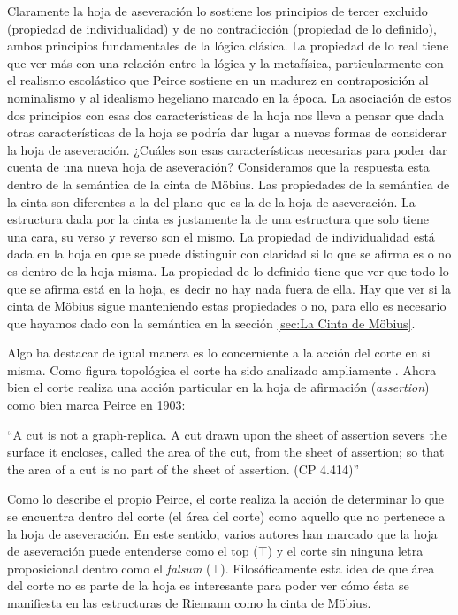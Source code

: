 \documentclass[
	fontsize=10pt, %
	twoside=false, %
	secnumdepth=1, %
	abstract=true, %
]{kaohandt}
\begin{document}
Claramente la hoja de aseveración lo sostiene los principios de tercer excluido (propiedad de individualidad) y de no contradicción (propiedad de lo definido), ambos principios fundamentales de la lógica clásica. La propiedad de lo real tiene que ver más con una relación entre la lógica y la metafísica, particularmente con el realismo escolástico que Peirce sostiene en un madurez en contraposición al nominalismo y al idealismo hegeliano marcado en la época. La asociación de estos dos principios con esas dos características de la hoja nos lleva a pensar que dada otras características de la hoja se podría dar lugar a nuevas formas de considerar la hoja de aseveración. ¿Cuáles son esas características necesarias para poder dar cuenta de una nueva hoja de aseveración? Consideramos que la respuesta esta dentro de la semántica de la cinta de Möbius. Las propiedades de la semántica de la cinta son diferentes a la del plano que es la de la hoja de aseveración. La estructura dada por la cinta es justamente la de una estructura que solo tiene una cara, su verso y reverso son el mismo. La propiedad de individualidad está dada en la hoja en que se puede distinguir con claridad si lo que se afirma es o no es dentro de la hoja misma. La propiedad de lo definido tiene que ver que todo lo que se afirma está en la hoja, es decir no hay nada fuera de ella. Hay que ver si la cinta de Möbius sigue manteniendo estas propiedades o no, para ello es necesario que hayamos dado con la semántica en la sección \ref{sec:La Cinta de Möbius}.

Algo ha destacar de igual manera es lo concerniente a la acción del corte en si misma. Como figura topológica el corte ha sido analizado ampliamente . Ahora bien el corte realiza una acción particular en la hoja de afirmación (\emph{assertion}) como bien marca Peirce en 1903:

\enquote{A cut is not a graph-replica. A cut drawn upon the sheet of assertion severs the surface it encloses, called the area of the cut, from the sheet of assertion; so that the area of a cut is no part of the sheet of assertion. (CP 4.414)}

Como lo describe el propio Peirce, el corte realiza la acción de determinar lo que se encuentra dentro del corte (el área del corte) como aquello que no pertenece a la hoja de aseveración. En este sentido, varios autores han marcado que la hoja de aseveración puede entenderse como el top ($\top$) y el corte sin ninguna letra proposicional dentro como el \textit{falsum} ($\bot$). Filosóficamente esta idea de que área del corte no es parte de la hoja es interesante para poder ver cómo ésta se manifiesta en las estructuras de Riemann como la cinta de Möbius.
\end{document}
